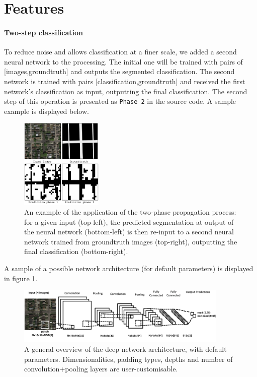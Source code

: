 \documentclass[fleqn,9 pt]{SelfArx} %
\begin{document}
\begin{sloppypar}
\section{Features}

\paragraph{Two-step classification} 

To reduce noise and allows classification at a finer scale, we added a second neural network to the processing. The initial one will be trained with pairs of [images,groundtruth] and outputs the segmented classification. The second network is trained with pairs [classification,groundtruth] and received the first network's classification as input, outputting the final classification. The second step of this operation is presented as \texttt{Phase 2} in the source code. A sample example is displayed below.

\begin{figure}[H]
\centering
\includegraphics[width=0.35\textwidth]{figures/two_phases_conv2d.pdf}
\caption{\small An example of the application of the two-phase propagation process: for a given input (top-left), the predicted segmentation at output of the neural network (bottom-left) is then re-input to a second neural network trained from groundtruth images (top-right), outputting the final classification (bottom-right).}
\end{figure}


A sample of a possible network architecture (for default parameters) is displayed in figure \ref{fig-conv-2d-architecture}.

\begin{figure}
\centering
\includegraphics[width=0.9\textwidth]{figures/conv_2d_network.png}
\caption{\small A general overview of the deep network architecture, with default parameters. Dimensionalities, padding types, depths and number of convolution+pooling layers are user-customisable.}
\label{fig-conv-2d-architecture}
\end{figure}


\end{sloppypar}
\end{document}

